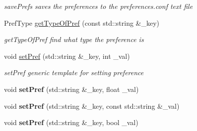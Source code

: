 \begin{DoxyCompactItemize}
\begin{DoxyCompactList}\small\item\em save\+Prefs saves the preferences to the preferences.\+conf text file \end{DoxyCompactList}\item 
Pref\+Type \hyperlink{class_prefs_a9ba03172930b21b2e60f390c39304627}{get\+Type\+Of\+Pref} (const std\+::string \&\+\_\+key)
\begin{DoxyCompactList}\small\item\em get\+Type\+Of\+Pref find what type the preference is \end{DoxyCompactList}\item 
void \hyperlink{class_prefs_a0747811585196ca1f4793618feeba49a}{set\+Pref} (std\+::string \&\+\_\+key, int \+\_\+val)
\begin{DoxyCompactList}\small\item\em set\+Pref generic template for setting preference \end{DoxyCompactList}\item 
\hypertarget{class_prefs_a7b4a75da465d0911b55696dc55744d27}{}void {\bfseries set\+Pref} (std\+::string \&\+\_\+key, float \+\_\+val)\label{class_prefs_a7b4a75da465d0911b55696dc55744d27}

\item 
\hypertarget{class_prefs_a5508ec6cff49fc4d2e5e416c3e4eba30}{}void {\bfseries set\+Pref} (std\+::string \&\+\_\+key, const std\+::string \&\+\_\+val)\label{class_prefs_a5508ec6cff49fc4d2e5e416c3e4eba30}

\item 
\hypertarget{class_prefs_a4f423e1536c62cd6fe4e165a77af6c53}{}void {\bfseries set\+Pref} (std\+::string \&\+\_\+key, bool \+\_\+val)\label{class_prefs_a4f423e1536c62cd6fe4e165a77af6c53}


\end{DoxyCompactItemize}
